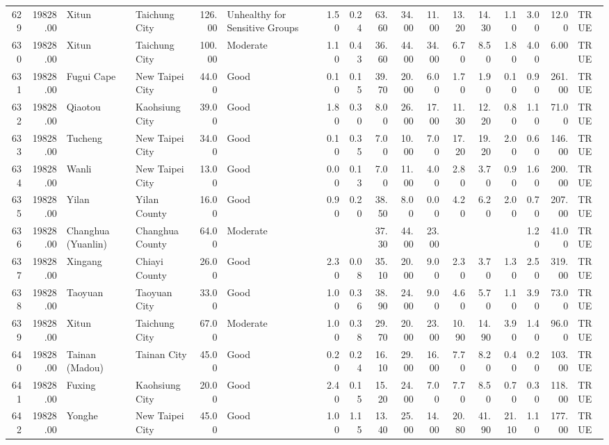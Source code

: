 \begin{table}[ht]
\begin{tabular}{rrllrlrrrrrrrrrrl}
  629 & 19828.00 & Xitun & Taichung City & 126.00 & Unhealthy for Sensitive Groups & 1.50 & 0.24 & 63.60 & 34.00 & 11.00 & 13.20 & 14.30 & 1.10 & 3.00 & 12.00 & TRUE \\ 
  630 & 19828.00 & Xitun & Taichung City & 100.00 & Moderate & 1.10 & 0.43 & 36.60 & 44.00 & 34.00 & 6.70 & 8.50 & 1.80 & 4.00 & 6.00 & TRUE \\ 
  631 & 19828.00 & Fugui Cape & New Taipei City & 44.00 & Good & 0.10 & 0.15 & 39.70 & 20.00 & 6.00 & 1.70 & 1.90 & 0.10 & 0.90 & 261.00 & TRUE \\ 
  632 & 19828.00 & Qiaotou & Kaohsiung City & 39.00 & Good & 1.80 & 0.30 & 8.00 & 26.00 & 17.00 & 11.30 & 12.20 & 0.80 & 1.10 & 71.00 & TRUE \\ 
  633 & 19828.00 & Tucheng & New Taipei City & 34.00 & Good & 0.10 & 0.35 & 7.00 & 10.00 & 7.00 & 17.20 & 19.20 & 2.00 & 0.60 & 146.00 & TRUE \\ 
  634 & 19828.00 & Wanli & New Taipei City & 13.00 & Good & 0.00 & 0.13 & 7.00 & 11.00 & 4.00 & 2.80 & 3.70 & 0.90 & 1.60 & 200.00 & TRUE \\ 
  635 & 19828.00 & Yilan & Yilan County & 16.00 & Good & 0.90 & 0.20 & 38.50 & 8.00 & 0.00 & 4.20 & 6.20 & 2.00 & 0.70 & 207.00 & TRUE \\ 
  636 & 19828.00 & Changhua (Yuanlin) & Changhua County & 64.00 & Moderate &  &  & 37.30 & 44.00 & 23.00 &  &  &  & 1.20 & 41.00 & TRUE \\ 
  637 & 19828.00 & Xingang & Chiayi County & 26.00 & Good & 2.30 & 0.08 & 35.10 & 20.00 & 9.00 & 2.30 & 3.70 & 1.30 & 2.50 & 319.00 & TRUE \\ 
  638 & 19828.00 & Taoyuan & Taoyuan City & 33.00 & Good & 1.00 & 0.36 & 38.90 & 24.00 & 9.00 & 4.60 & 5.70 & 1.10 & 3.90 & 73.00 & TRUE \\ 
  639 & 19828.00 & Xitun & Taichung City & 67.00 & Moderate & 1.00 & 0.38 & 29.70 & 20.00 & 23.00 & 10.90 & 14.90 & 3.90 & 1.40 & 96.00 & TRUE \\ 
  640 & 19828.00 & Tainan (Madou) & Tainan City & 45.00 & Good & 0.20 & 0.24 & 16.10 & 29.00 & 16.00 & 7.70 & 8.20 & 0.40 & 0.20 & 103.00 & TRUE \\ 
  641 & 19828.00 & Fuxing & Kaohsiung City & 20.00 & Good & 2.40 & 0.15 & 15.20 & 24.00 & 7.00 & 7.70 & 8.50 & 0.70 & 0.30 & 118.00 & TRUE \\ 
  642 & 19828.00 & Yonghe & New Taipei City & 45.00 & Good & 1.00 & 1.15 & 13.40 & 25.00 & 14.00 & 20.80 & 41.90 & 21.10 & 1.10 & 177.00 & TRUE \\ 

\end{tabular}
\end{table}
